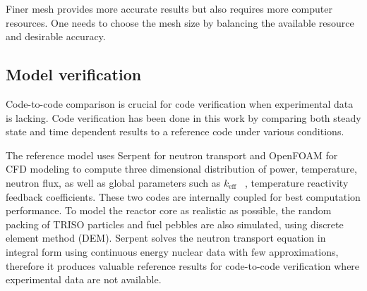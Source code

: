 \documentclass{elsarticle}
\newcommand{\keff}{{\ensuremath{k_{\mathrm{eff}}}} }
\begin{document}
Finer mesh provides more accurate results but also requires more computer resources. One needs to choose the mesh size by balancing the available resource and desirable accuracy. 




\subsection{Model verification}
Code-to-code comparison is crucial for code verification when experimental data is lacking. Code verification has been done in this work by comparing both steady state and time dependent results to a reference code under various conditions. 

The reference model \cite{Aufiero2016} uses Serpent for neutron transport and OpenFOAM for CFD modeling to compute three dimensional distribution of power, temperature, neutron flux, as well as global parameters such as \keff\ , temperature reactivity feedback coefficients. These two codes are internally coupled for best computation performance. To model the reactor core as realistic as possible, the random packing of TRISO particles and fuel pebbles are also simulated, using discrete element method (DEM). 
Serpent solves the neutron transport equation in integral form using continuous energy nuclear data with few approximations, therefore it produces valuable reference results for code-to-code verification where experimental data are not available. 
\end{document}
